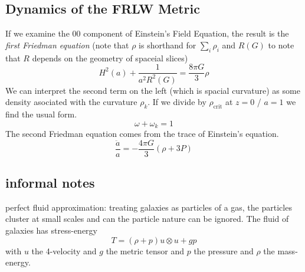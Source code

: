 \subsection{Dynamics of the FRLW Metric}
If we examine the $00$ component of Einstein's Field Equation, the result is the \textit{first Friedman equation} (note that $\rho$ is shorthand for $\sum_i\rho_i$ and $R(G)$ to note that $R$ depends on the geometry of spaceial slices)
\begin{equation}
    H^2(a) + \frac{1}{a^2 R^2(G)} = \frac{8\pi G}{3}\rho
\end{equation}
We can interpret the second term on the left (which is spacial curvature) as some density asociated with the curvature $\rho_k$. If we divide by $\rho_{\text{crit}}$ at $z=0$ / $a=1$ we find the usual form. 
\begin{equation}
    \omega + \omega_k = 1 
\end{equation}
The second Friedman equation comes from the trace of Einstein's equation.
\begin{equation}
    \frac{\ddot a}{a} = -\frac{4\pi G}{3}(\rho + 3P)
\end{equation}

\subsection{informal notes}
perfect fluid approximation: treating galaxies as particles of a gas, the particles cluster at small scales and can the particle nature can be ignored. The fluid of galaxies has stress-energy 
\begin{equation*}
    T = (\rho+p) u\otimes u + gp
\end{equation*}
with $u$ the 4-velocity and $g$ the metric tensor and $p$ the pressure and $\rho$ the mass-energy.
